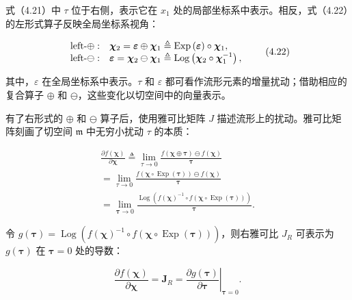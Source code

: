 式（4.21）中 $\tau$ 位于右侧，表示它在 $x _ { 1 }$ 处的局部坐标系中表示。相反，式（4.22）的左形式算子反映全局坐标系视角：

\begin{equation}
\begin{array}{l l} \text {left-} \oplus : & \boldsymbol {\chi} _ {2} = \boldsymbol {\varepsilon} \oplus \boldsymbol {\chi} _ {1} \triangleq \operatorname{Exp} \left(\boldsymbol {\varepsilon}\right) \circ \boldsymbol {\chi} _ {1}, \\ \text {left-} \ominus : & \boldsymbol {\varepsilon} = \boldsymbol {\chi} _ {2} \ominus \boldsymbol {\chi} _ {1} \triangleq \operatorname{Log} \left(\boldsymbol {\chi} _ {2} \circ \boldsymbol {\chi} _ {1} ^ {- 1}\right), \end{array}\tag{4.22}
\end{equation}

其中，$\varepsilon$ 在全局坐标系中表示。$\tau$ 和 $\varepsilon$ 都可看作流形元素的增量扰动；借助相应的复合算子 $\oplus$ 和 $\ominus$，这些变化以切空间中的向量表示。

有了右形式的 $\oplus$ 和 $\ominus$ 算子后，使用雅可比矩阵 $J$ 描述流形上的扰动。雅可比矩阵刻画了切空间 $\mathfrak m$ 中无穷小扰动 $\tau$ 的本质：

\begin{equation}
\begin{array}{l} \frac {\partial f (\boldsymbol {\chi})}{\partial \boldsymbol {\chi}} \triangleq \lim _ {\tau \to 0} \frac {f (\boldsymbol {\chi} \oplus \boldsymbol {\tau}) \ominus f (\boldsymbol {\chi})}{\boldsymbol {\tau}} \\ = \lim _ {\tau \to 0} \frac {f (\boldsymbol {\chi} \circ \operatorname{Exp} (\boldsymbol {\tau})) \ominus f (\boldsymbol {\chi})}{\boldsymbol {\tau}} \\ = \lim _ {\boldsymbol {\tau} \to 0} \frac {\operatorname{Log} \left(f (\boldsymbol {\chi}) ^ {- 1} \circ f (\boldsymbol {\chi} \circ \operatorname{Exp} (\boldsymbol {\tau}))\right)}{\boldsymbol {\tau}}. \end{array}\tag{4.23}
\end{equation}

令 $g(\pmb{\tau}) = \operatorname{Log}\left(f(\pmb{\chi})^{-1} \circ f(\pmb{\chi} \circ \operatorname{Exp}(\pmb{\tau}))\right)$，则右雅可比 $J_R$ 可表示为 $g(\pmb{\tau})$ 在 $\pmb{\tau} = 0$ 处的导数：

\begin{equation}
\frac {\partial f (\boldsymbol {\chi})}{\partial \boldsymbol {\chi}} = \boldsymbol {J} _ {R} = \left. \frac {\partial g (\boldsymbol {\tau})}{\partial \boldsymbol {\tau}} \right| _ {\boldsymbol {\tau} = 0}.\tag{4.24}
\end{equation}

